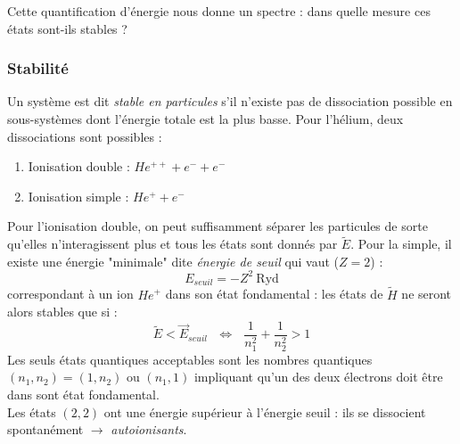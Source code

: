 \documentclass	[11pt, a4paper, openany]{book}
\newcommand{\E}{\vec E}
\begin{document}
	Cette quantification d'énergie nous donne un spectre : dans quelle mesure ces 
	états sont-ils stables ?
		
	\subsubsection{Stabilité}
	Un système est dit \textit{stable en particules} s'il n'existe pas de dissociation 
	possible en sous-systèmes dont l'énergie totale est la plus basse. Pour l'hélium, 
	deux dissociations sont possibles : 
	\begin{enumerate}
		\item Ionisation double : $He^{++} + e^- + e^-$
		\item Ionisation simple : $He^{+} + e^-$
	\end{enumerate}
	
	Pour l'ionisation double, on peut suffisamment séparer les particules de sorte 
	qu'elles n'interagissent plus et tous les états sont donnés par $\tilde{E}$. Pour 
	la simple, il existe une énergie "minimale" dite \textit{énergie de seuil} qui 
	vaut ($Z=2$) :
	\begin{equation}
		E_{seuil} = -Z^2\ \text{Ryd}
	\end{equation}
	correspondant à un ion $He^+$ dans son état fondamental : les états de $\tilde{H}$
	ne seront alors stables que si : 
	\begin{equation}
		\tilde{E}<\E_{seuil}\ \ \ \Leftrightarrow\ \ \ \frac{1}{n_1^2}+\frac{1}{n_2^2} >1
	\end{equation}
	Les seuls états quantiques acceptables sont les nombres quantiques $(n_1,n_2) = (1,
	n_2)$ ou $(n_1,1)$ impliquant qu'un des deux électrons doit être dans sont état
	fondamental.\\
	Les états $(2,2)$ ont une énergie supérieur à l'énergie seuil : ils se dissocient
	spontanément $\rightarrow$ \textit{autoionisants}.
	
	
\end{document}
